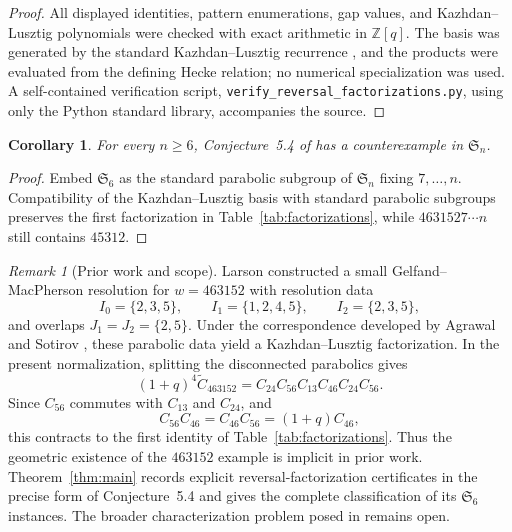 \documentclass[10pt]{amsart}
\newtheorem{corollary}[theorem]{Corollary}
\theoremstyle{remark}
\newtheorem{remark}[theorem]{Remark}
\newcommand{\Ssix}{\mathfrak S_6}
\newcommand{\Ct}{\widetilde C}
\newcommand{\Cab}[2]{C_{#1#2}}
\begin{document}
\begin{proof}
All displayed identities, pattern enumerations, gap values, and
Kazhdan--Lusztig polynomials were checked with exact arithmetic in
$\mathbb Z[q]$. The basis was generated by the standard
Kazhdan--Lusztig recurrence \cite[Chap.~5]{BjornerBrenti}, and the
products were evaluated from the defining Hecke relation; no numerical
specialization was used. A self-contained verification script,
\texttt{verify\_reversal\_factorizations.py}, using only the Python
standard library, accompanies the source.
\end{proof}

\begin{corollary}\label{cor:alln}
For every $n\geq6$, Conjecture~5.4 of \cite{ParisiEtAl} has a
counterexample in $\mathfrak S_n$.
\end{corollary}

\begin{proof}
Embed $\Ssix$ as the standard parabolic subgroup of $\mathfrak S_n$
fixing $7,\ldots,n$. Compatibility of the Kazhdan--Lusztig basis with
standard parabolic subgroups preserves the first factorization in
Table~\ref{tab:factorizations}, while
$4631527\cdots n$ still contains $45312$.
\end{proof}

\begin{remark}[Prior work and scope]\label{rem:prior}
Larson \cite[Ex.~6.11]{Larson} constructed a small
Gelfand--MacPherson resolution for $w=463152$ with resolution data
\[
I_0=\{2,3,5\},\qquad I_1=\{1,2,4,5\},\qquad
I_2=\{2,3,5\},
\]
and overlaps $J_1=J_2=\{2,5\}$. Under the correspondence developed
by Agrawal and Sotirov
\cite[Cor.~6.21 and Sec.~8]{AgrawalSotirov}, these parabolic data
yield a Kazhdan--Lusztig factorization. In the present normalization,
splitting the disconnected parabolics gives
\[
(1+q)^4\Ct_{463152}
 =\Cab{2}{4}\Cab{5}{6}\Cab{1}{3}\Cab{4}{6}
  \Cab{2}{4}\Cab{5}{6}.
\]
Since $\Cab{5}{6}$ commutes with $\Cab{1}{3}$ and $\Cab{2}{4}$, and
\[
\Cab{5}{6}\Cab{4}{6}
 =\Cab{4}{6}\Cab{5}{6}
 =(1+q)\Cab{4}{6},
\]
this contracts to the first identity of
Table~\ref{tab:factorizations}. Thus the geometric existence of the
$463152$ example is implicit in prior work.
Theorem~\ref{thm:main} records explicit reversal-factorization
certificates in the precise form of Conjecture~5.4 and gives the
complete classification of its $\Ssix$ instances. The broader
characterization problem posed in \cite[Quest.~4.5]{Skandera}
remains open.
\end{remark}
\end{document}

